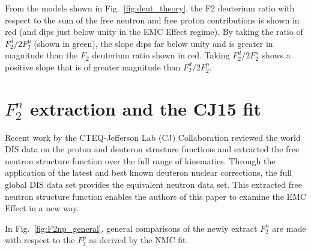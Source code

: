 \documentclass[oneside]{article}
\begin{document}
From the models shown in Fig.~\ref{fig:deut_theory}, the F2 deuterium ratio with respect to the sum of the free neutron and free proton contributions is shown in red (and dips just below unity in the EMC Effect regime). By taking the ratio of $F_2^d/2F_2^p$ (shown in green), the slope dips far below unity and is greater in magnitude than the $F_2$ deuterium ratio shown in red. Taking $F_2^d/2F_2^n$ shows a positive slope that is of greater magnitude than $F_2^d/2F_2^p$. 


\section{$F_2^n$ extraction and the CJ15 fit}

Recent work by the CTEQ-Jefferson Lab (CJ) Collaboration reviewed the world DIS data on the proton and deuteron structure functions and extracted the free neutron structure function over the full range of kinematics. Through the application of the latest and best known deuteron nuclear corrections, the full global DIS data set provides the equivalent neutron data set. This extracted free neutron structure function enables the authors of this paper to examine the EMC Effect in a new way. 

In Fig.~\ref{fig:F2np_general}, general comparisons of the newly extract $F_2^n$ are made with respect to the $F_2^p$ as derived by the NMC fit. 
\end{document}
